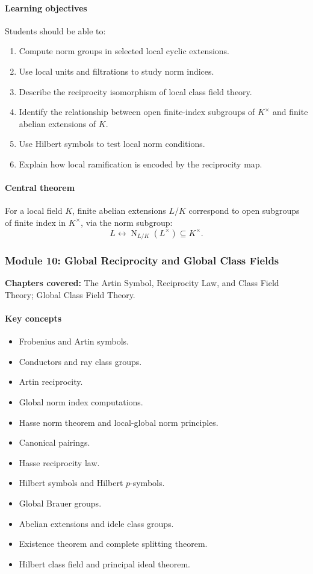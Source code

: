 \documentclass[11pt]{article}
\newcommand{\Norm}{\operatorname{N}}
\begin{document}
\paragraph{Learning objectives}
Students should be able to:
\begin{enumerate}
    \item Compute norm groups in selected local cyclic extensions.
    \item Use local units and filtrations to study norm indices.
    \item Describe the reciprocity isomorphism of local class field theory.
    \item Identify the relationship between open finite-index subgroups of $K^\times$ and finite abelian extensions of $K$.
    \item Use Hilbert symbols to test local norm conditions.
    \item Explain how local ramification is encoded by the reciprocity map.
\end{enumerate}

\paragraph{Central theorem}
For a local field $K$, finite abelian extensions $L/K$ correspond to open subgroups of finite index in $K^\times$, via the norm subgroup:
\[
L \longleftrightarrow \Norm_{L/K}(L^\times)\subseteq K^\times.
\]

\subsubsection*{Module 10: Global Reciprocity and Global Class Fields}

\textbf{Chapters covered:} The Artin Symbol, Reciprocity Law, and Class Field Theory; Global Class Field Theory.

\paragraph{Key concepts}
\begin{itemize}
    \item Frobenius and Artin symbols.
    \item Conductors and ray class groups.
    \item Artin reciprocity.
    \item Global norm index computations.
    \item Hasse norm theorem and local-global norm principles.
    \item Canonical pairings.
    \item Hasse reciprocity law.
    \item Hilbert symbols and Hilbert $p$-symbols.
    \item Global Brauer groups.
    \item Abelian extensions and idele class groups.
    \item Existence theorem and complete splitting theorem.
    \item Hilbert class field and principal ideal theorem.
\end{itemize}
\end{document}
